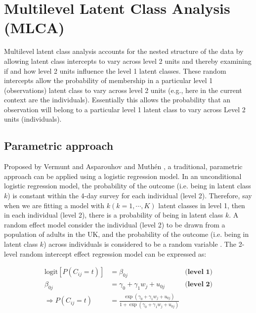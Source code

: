 
\section{Multilevel Latent Class Analysis (MLCA)}\vspace{-0.3cm}


Multilevel latent class analysis accounts for the nested structure of the data by allowing latent class intercepts to vary across level 2 units and thereby examining if and how level 2 units influence the level 1 latent classes. These random intercepts allow the probability of
membership in a particular level 1 (observations) latent class to vary across level 2 units (e.g., here in the current context are the individuals). Essentially this allows the probability that an observation will belong to a
particular level 1 latent class to vary across Level 2 units (individuals). \vspace{-0.5cm}

\subsection{Parametric approach}\vspace{-0.3cm}

Proposed by Vermunt \parencite{Vermunt, vermunt2008latent} and Asparouhov and Muth\'en \parencite{muthen2009multilevel},  a traditional, parametric approach can be applied using a logistic regression model. In an unconditional logistic regression model, the probability of the outcome (i.e. being in latent class $k$) is constant within the 4-day survey for each individual (level 2). Therefore, say when we are fitting a model with $k (k = 1, \cdots, K)$ latent classes in level 1, then in each individual (level 2), there is a probability of being in latent class $k$. A random effect model consider the individual (level 2) to be drawn from a population of adults in the UK, and the probability of the outcome (i.e. being in latent class $k$) across individuals is considered to be a random variable \parencite{snijders2011multilevel}. The 2-level random intercept effect regression model can be expressed as:\vspace{-0.4cm}


\begin{equation}
\begin{aligned}
\text{logit}[P(C_{ij} = t)] & = \beta_{0j} & \textbf{(level 1)}  \\
\beta_{0j} & = \gamma_0 + \gamma_1 w_j + u_{0j} & \textbf{(level 2)} \\ 
\Rightarrow P(C_{ij} = t) & = \frac{\exp{(\gamma_0 + \gamma_1 w_j + u_{0j})}}{1 + \exp{(\gamma_0 + \gamma_1 w_j + u_{0j})}} \\
\end{aligned}
\label{randomLCA}
\end{equation}
\vspace{-0.3cm}

